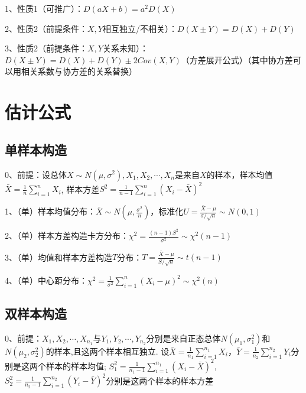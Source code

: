 1、性质1（可推广）：$D(a X+b)=a^{2} D(X) $

2、性质2（前提条件：$X,Y$相互独立/不相关）：$D(X \pm Y)=D(X)+D(Y)$

3、性质2（前提条件：$X,Y$关系未知）：$D ( X \pm Y ) = D ( X ) + D ( Y ) \pm 2 Cov ( X , Y )  $（方差展开公式）（其中协方差可以用相关系数与协方差的关系替换）

\section{估计公式}



\subsection{单样本构造}

0、前提：设总体$X \sim N\left(\mu, \sigma^{2}\right), X_{1}, X_{2},\cdots, X_{n}$是来自$X$的样本，样本均值$\bar{X}=\frac{1}{n} \sum_{i=1}^{n} X_{i}$, 样本方差$S^{2}=\frac{1}{n-1} \sum_{i=1}^{n}\left(X_{i}-\bar{X}\right)^{2}$

1、（单）样本均值分布：$\bar{X} \sim N\left(\mu, \frac{\sigma^{2}}{n}\right)$，标准化$U=\frac{\bar{X}-\mu}{\sigma / \sqrt{n}} \sim N(0,1)$

2、（单）样本方差构造卡方分布：$\chi^{2}=\frac{(n-1) S^{2}}{\sigma^{2}} \sim \chi^{2}(n-1)$

3、（单）均值和样本方差构造$T$分布：$T=\frac{\bar{X}-\mu}{S / \sqrt{n}} \sim t(n-1)$

4、（单）中心距分布：$\chi^{2}=\frac{1}{\sigma^{2}} \sum_{i=1}^{n}\left(X_{i}-\mu\right)^{2} \sim \chi^{2}(n)$



\subsection{双样本构造}

0、前提：$X_{1}, X_{2}, \cdots, X_{n_{1}}$与$Y_{1}, Y_{2}, \cdots,Y_{n_{2}}$分别是来自正态总体$N\left(\mu_{1}, \sigma_{1}^{2}\right)$和$N\left(\mu_{2}, \sigma_{2}^{2}\right)$的样本,且这两个样本相互独立. 设$\bar{X}=\frac{1}{n_{1}} \sum_{i=1}^{n_{1}} X_{i}$，$\bar{Y}=\frac{1}{n_{2}} \sum_{i=1}^{n_{2}} Y_{i}$分别是这两个样本的样本均值; $S_{1}^{2}=\frac{1}{n_{1}-1} \sum_{i=1}^{n_{1}}\left(X_{i}-\bar{X}\right)^{2}$, $S_{2}^{2}=\frac{1}{n_{2}-1} \sum_{i=1}^{n_{2}}\left(Y_{i}-\bar{Y}\right)^{2}$分别是这两个样本的样本方差

